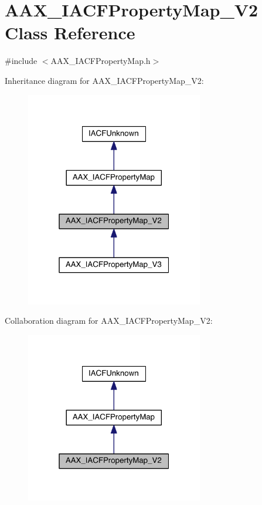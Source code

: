 \hypertarget{a00080}{}\section{A\+A\+X\+\_\+\+I\+A\+C\+F\+Property\+Map\+\_\+\+V2 Class Reference}
\label{a00080}


{\ttfamily \#include $<$A\+A\+X\+\_\+\+I\+A\+C\+F\+Property\+Map.\+h$>$}



Inheritance diagram for A\+A\+X\+\_\+\+I\+A\+C\+F\+Property\+Map\+\_\+\+V2\+:
\nopagebreak
\begin{figure}[H]
\begin{center}
\leavevmode
\includegraphics[width=220pt]{a00583}
\end{center}
\end{figure}


Collaboration diagram for A\+A\+X\+\_\+\+I\+A\+C\+F\+Property\+Map\+\_\+\+V2\+:
\nopagebreak
\begin{figure}[H]
\begin{center}
\leavevmode
\includegraphics[width=220pt]{a00584}
\end{center}
\end{figure}


